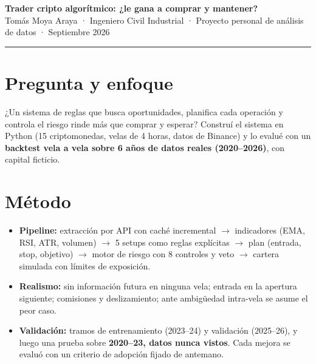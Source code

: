 \documentclass[10pt,a4paper]{article}
\begin{document}
{\LARGE\bfseries Trader cripto algorítmico: ¿le gana a comprar y mantener?}\\[0.3em]
{\color{gris}Tomás Moya Araya · Ingeniero Civil Industrial · Proyecto personal de análisis de datos · Septiembre 2026}\\[-0.4em]
\textcolor{acento}{\rule{\linewidth}{1.2pt}}

\section{Pregunta y enfoque}
¿Un sistema de reglas que busca oportunidades, planifica cada operación y controla el riesgo rinde más que comprar y
esperar? Construí el sistema en Python (15 criptomonedas, velas de 4 horas, datos de Binance) y lo evalué con un
\textbf{backtest vela a vela sobre 6 años de datos reales (2020--2026)}, con capital ficticio.

\section{Método}
\begin{itemize}
  \item \textbf{Pipeline:} extracción por API con caché incremental $\rightarrow$ indicadores (EMA, RSI, ATR, volumen)
        $\rightarrow$ 5 setups como reglas explícitas $\rightarrow$ plan (entrada, stop, objetivo) $\rightarrow$
        motor de riesgo con 8 controles y veto $\rightarrow$ cartera simulada con límites de exposición.
  \item \textbf{Realismo:} sin información futura en ninguna vela; entrada en la apertura siguiente; comisiones y
        deslizamiento; ante ambigüedad intra-vela se asume el peor caso.
  \item \textbf{Validación:} tramos de entrenamiento (2023--24) y validación (2025--26), y luego una prueba sobre
        \textbf{2020--23, datos nunca vistos}. Cada mejora se evaluó con un criterio de adopción fijado de antemano.
\end{itemize}
\end{document}
